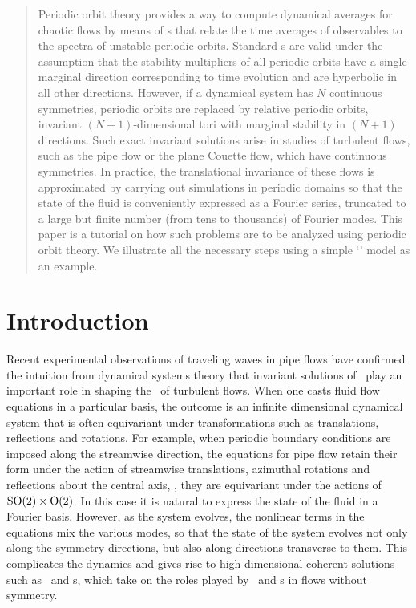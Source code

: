 \documentclass[aip,cha,
reprint,
secnumarabic,
nofootinbib, tightenlines,
nobibnotes, showkeys, showpacs,
superscriptaddress,
]{revtex4-1}
\begin{document}
\begin{quotation}
Periodic orbit theory provides a way to compute dynamical averages for
chaotic flows by means of {\cycForm s} that relate the time averages of
observables to the spectra of unstable periodic orbits. Standard
{\cycForm s} are valid under the assumption that the stability
multipliers of all periodic orbits have a single marginal direction
corresponding to time evolution and are hyperbolic in all other
directions. However, if a dynamical system has $N$ continuous symmetries,
periodic orbits are replaced by relative periodic orbits, invariant
$(N+1)$-dimensional tori with marginal stability in $(N+1)$ directions.
Such exact invariant solutions arise in studies of turbulent flows, such
as the pipe flow or the plane Couette flow, which have continuous symmetries.
In practice, the translational invariance of these flows is approximated by 
carrying out simulations in periodic domains so that the state of the fluid 
is conveniently expressed as a Fourier series, truncated to a large but finite 
number (from tens to thousands) of Fourier modes. This paper is a tutorial on 
how such problems are to be analyzed using periodic orbit theory. We illustrate 
all the necessary steps using a simple `\twomode' model as an example.
\end{quotation}

\section{Introduction}
\label{s:intro}

Recent experimental observations of traveling waves in pipe flows have
confirmed the intuition from dynamical systems theory that invariant solutions
of \NSe\ play an important role in shaping the \statesp\ of turbulent
flows. When one casts fluid flow equations in a
particular basis, the outcome is an infinite dimensional dynamical system
that is often equivariant under transformations such as
translations, reflections and rotations. For example, when periodic
boundary conditions are imposed along the streamwise direction, the equations
for pipe flow retain their form under the action of streamwise translations, 
azimuthal rotations and reflections about the central axis, \ie, they are equivariant
under the actions of $\textrm{SO}(2) \times \textrm{O}(2)$. In this case it is natural
to express the state of the fluid in a Fourier basis. However,
as the system evolves, the nonlinear terms in the equations mix the
various modes, so that the state of the system evolves not only along the
symmetry directions, but also along directions transverse to them.
This complicates the dynamics and gives rise to high dimensional coherent
solutions such as \reqva\ and \rpo s, which take on the roles played by
\eqva\ and \po s in flows without symmetry.
\end{document}
